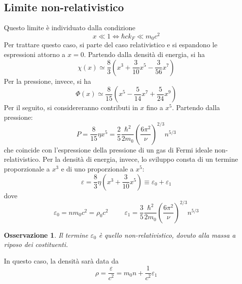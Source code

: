 \documentclass[11pt, a4paper]{scrartcl}
\theoremstyle{style}
\newtheorem{osservazione}{Osservazione}[section]
\numberwithin{equation}{subsection}
\begin{document}
\subsection{Limite non-relativistico}

Questo limite \`e individuato dalla condizione
\begin{equation}
	x \ll 1 \iff \hbar  c k_F \ll m_0c^2
\end{equation}
Per trattare questo caso, si parte del caso relativistico e si espandono le espressioni attorno a $x=0$. 
Partendo dalla densit\`a di energia, si ha
\[
\chi (x) \simeq \frac{8}{3} \left( x^3 + \frac{3}{10}x^5 - \frac{3}{56}x^7\right) 
\] 
Per la pressione, invece, si ha
\[
\Phi (x) \simeq \frac{8}{15} \left(x^5 - \frac{5}{14} x^7+ \frac{5}{24} x^9\right) 
\] 
Per il seguito, si considereranno contributi in $x$ fino a $x^5$.
Partendo dalla pressione:
\[
		P = \frac{8}{15} \eta x^5= \frac{2}{5} \frac{\hbar ^2}{2m_0} \left(\frac{6\pi^2}{\nu }\right)  ^{2 / 3} n^{ 5 / 3}
\] 
che coincide con l'espressione della pressione di un gas di Fermi ideale non-relativistico.
Per la densit\`a di energia, invece, lo sviluppo consta di un termine proporzionale a $x^3$ e di uno proporzionale a $x^5$:
\[
\varepsilon = \frac{8}{3}\eta \left(x^3 + \frac{3}{10}x^5\right) \equiv \varepsilon _0 + \varepsilon _1
\] 
dove
\[
\varepsilon _0 = nm_0c^2 =\rho_0 c^2 \hspace{1cm} \varepsilon _1 = \frac{3}{5} \frac{\hbar ^2}{2m_0} \left(\frac{6\pi^2}{\nu }\right) ^{2 /3 } n^{5 / 3}
\] 
\begin{osservazione}
Il termine $\varepsilon _0$ \`e quello non-relativistico, dovuto alla massa a riposo dei costituenti.
\end{osservazione}

\noindent In questo caso, la densit\`a sar\`a data da
\[
\rho  = \frac{\varepsilon }{c^2} = m_0 n + \frac{1}{c^2} \varepsilon _1
\] 


\newpage
\end{document}
